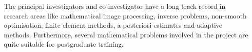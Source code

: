 \documentclass[enabledeprecatedfontcommands,cleardoublepage=empty,headsepline,twoside,11pt,DIV=15,BCOR=12mm,final]{scrartcl}
\begin{document}

The principal investigators and co-investigator have a long track record in research areas like mathematical image processing, inverse problems, non-smooth optimisation, finite element methods, a posteriori estimates and adaptive methods. Furthermore, several mathematical problems involved in the project are quite suitable for postgraduate training.






\end{document}

